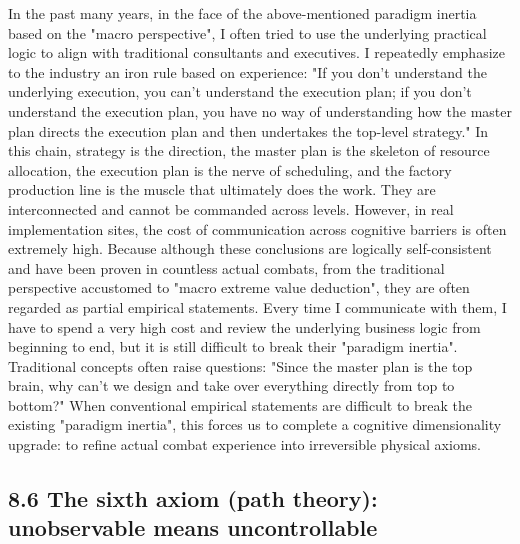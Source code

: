 \documentclass[11pt,a4paper]{article}
\begin{document}
In the past many years, in the face of the above-mentioned paradigm inertia based on the "macro perspective", I often tried to use the underlying practical logic to align with traditional consultants and executives. I repeatedly emphasize to the industry an iron rule based on experience: "If you don't understand the underlying execution, you can't understand the execution plan; if you don't understand the execution plan, you have no way of understanding how the master plan directs the execution plan and then undertakes the top-level strategy." In this chain, strategy is the direction, the master plan is the skeleton of resource allocation, the execution plan is the nerve of scheduling, and the factory production line is the muscle that ultimately does the work. They are interconnected and cannot be commanded across levels. However, in real implementation sites, the cost of communication across cognitive barriers is often extremely high. Because although these conclusions are logically self-consistent and have been proven in countless actual combats, from the traditional perspective accustomed to "macro extreme value deduction", they are often regarded as partial empirical statements. Every time I communicate with them, I have to spend a very high cost and review the underlying business logic from beginning to end, but it is still difficult to break their "paradigm inertia". Traditional concepts often raise questions: "Since the master plan is the top brain, why can't we design and take over everything directly from top to bottom?" When conventional empirical statements are difficult to break the existing "paradigm inertia", this forces us to complete a cognitive dimensionality upgrade: to refine actual combat experience into irreversible physical axioms.


\subsection*{8.6 The sixth axiom (path theory): unobservable means uncontrollable}
\end{document}
